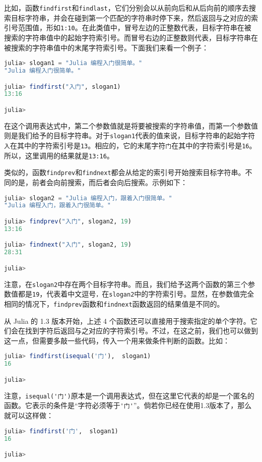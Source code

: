 比如，函数\verb|findfirst|和\verb|findlast|，它们分别会以从前向后和从后向前的顺序去搜索目标字符串，并会在碰到第一个匹配的字符串时停下来，然后返回与之对应的索引号范围值，形如\verb|1:10|。在此类值中，冒号左边的正整数代表，目标字符串在被搜索的字符串值中的起始字符索引号。而冒号右边的正整数则代表，目标字符串在被搜索的字符串值中的末尾字符索引号。下面我们来看一个例子：
\begin{lstlisting}[language=julia]
julia> slogan1 = "Julia 编程入门很简单。"
"Julia 编程入门很简单。"

julia> findfirst("入门", slogan1)
13:16

julia> 
\end{lstlisting}

在这个调用表达式中，第二个参数值就是将要被搜索的字符串值，而第一个参数值则是我们给予的目标字符串。对于\verb|slogan1|代表的值来说，目标字符串的起始字符\verb|入|在其中的字符索引号是\verb|13|。相应的，它的末尾字符\verb|门|在其中的字符索引号是\verb|16|。所以，这里调用的结果就是\verb|13:16|。

类似的，函数\verb|findprev|和\verb|findnext|都会从给定的索引号开始搜索目标字符串。不同的是，前者会向前搜索，而后者会向后搜索。示例如下：
\begin{lstlisting}[language=julia]
julia> slogan2 = "Julia 编程入门，跟着入门很简单。"
"Julia 编程入门，跟着入门很简单。"

julia> findprev("入门", slogan2, 19)
13:16

julia> findnext("入门", slogan2, 19)
28:31

julia> 
\end{lstlisting}

注意，在\verb|slogan2|中存在两个目标字符串。而且，我们给予这两个函数的第三个参数值都是\verb|19|，代表着中文逗号\verb|，|在\verb|slogan2|中的字符索引号。显然，在参数值完全相同的情况下，\verb|findprev|函数和\verb|findnext|函数返回的结果值是不同的。

从 Julia 的 1.3 版本开始，上述 4 个函数还可以直接用于搜索指定的单个字符。它们会在找到字符后返回与之对应的字符索引号。不过，在这之前，我们也可以做到这一点，但需要多敲一些代码，传入一个用来做条件判断的函数。比如：
\begin{lstlisting}[language=julia]
julia> findfirst(isequal('门'),  slogan1) 
16

julia> 
\end{lstlisting}

注意，\verb|isequal('门')|原本是一个调用表达式，但在这里它代表的却是一个匿名的函数。它表示的条件是“字符必须等于\verb|'门'|”。倘若你已经在使用1.3版本了，那么就可以这样做：
\begin{lstlisting}[language=julia]
julia> findfirst('门',  slogan1)
16

julia> 
\end{lstlisting}

